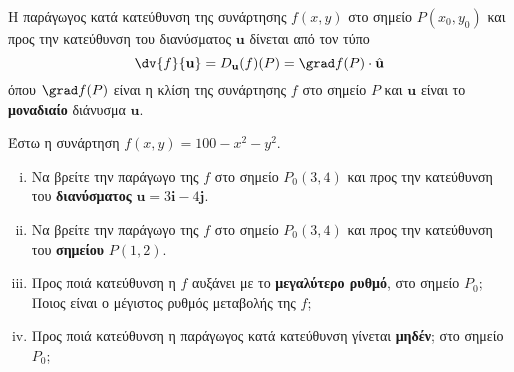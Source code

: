 \begin{dfn}
  Η \textcolor{Col1}{παράγωγος κατά κατεύθυνση} της συνάρτησης $ f(x,y) $ στο σημείο 
  $ P(x_{0}, y_{0}) $ και προς την κατεύθυνση του διανύσματος $ \mathbf{u} $ 
  δίνεται από τον τύπο
  \[
    \dv{f}{\mathbf{u}} = D_{\mathbf{u}}(f)(P) = \grad f(P) \cdot \hat{\mathbf{u}} 
  \] 
  όπου $ \grad f (P) $ είναι η κλίση της συνάρτησης $f$ στο σημείο $P$ και 
  $ \mathbf{u} $ είναι το \textbf{μοναδιαίο} διάνυσμα $ \mathbf{u} $.
\end{dfn}
\begin{example}
  Έστω η συνάρτηση $ f(x,y) = 100-x^{2}-y^{2} $. 
  \begin{enumerate}[i)]
    \item Να βρείτε την παράγωγο της $f$ στο σημείο $ P_{0}(3,4) $ και προς την 
      κατεύθυνση του \textbf{διανύσματος} $ \mathbf{u} = 3 \mathbf{i}- 4 \mathbf{j} $.
    \item Να βρείτε την παράγωγο της $f$ στο σημείο $ P_{0}(3,4) $ και προς την 
      κατεύθυνση του \textbf{σημείου} $P(1,2)$.
    \item Προς ποιά κατεύθυνση η $f$ αυξάνει με το \textbf{μεγαλύτερο ρυθμό}, 
      στο σημείο $ P_{0} $; Ποιος είναι ο μέγιστος ρυθμός μεταβολής της $f$;
    \item Προς ποιά κατεύθυνση η παράγωγος κατά κατεύθυνση γίνεται \textbf{μηδέν}; στο 
      σημείο $ P_{0} $;
  \end{enumerate}
\end{example}
